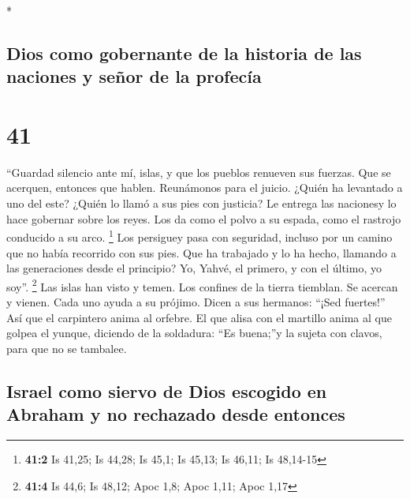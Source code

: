 \begin{paracol}{2}
\begin{otherlanguage}{english}
\end{otherlanguage}

\switchcolumn[0]*

\hypertarget{dios-como-gobernante-de-la-historia-de-las-naciones-y-seuxf1or-de-la-profecuxeda}{%
\subsection{Dios como gobernante de la historia de las naciones y señor
de la
profecía}\label{dios-como-gobernante-de-la-historia-de-las-naciones-y-seuxf1or-de-la-profecuxeda}}

\hypertarget{section-80}{%
\section{41}\label{section-80}}

 ``Guardad silencio ante mí, islas, y que los pueblos
renueven sus fuerzas. Que se acerquen, entonces que hablen. Reunámonos
para el juicio.  ¿Quién ha levantado a uno del este?
¿Quién lo llamó a sus pies con justicia? Le entrega las nacionesy lo
hace gobernar sobre los reyes. Los da como el polvo a su espada, como el
rastrojo conducido a su arco. \footnote{\textbf{41:2} Is 41,25; Is
  44,28; Is 45,1; Is 45,13; Is 46,11; Is 48,14-15}  Los
persiguey pasa con seguridad, incluso por un camino que no había
recorrido con sus pies.  Que ha trabajado y lo ha hecho,
llamando a las generaciones desde el principio? Yo, Yahvé, el primero, y
con el último, yo soy''. \footnote{\textbf{41:4} Is 44,6; Is 48,12; Apoc
  1,8; Apoc 1,11; Apoc 1,17}  Las islas han visto y temen.
Los confines de la tierra tiemblan. Se acercan y vienen. 
Cada uno ayuda a su prójimo. Dicen a sus hermanos: ``¡Sed fuertes!''
 Así que el carpintero anima al orfebre. El que alisa con
el martillo anima al que golpea el yunque, diciendo de la soldadura:
``Es buena;''y la sujeta con clavos, para que no se tambalee.

\hypertarget{israel-como-siervo-de-dios-escogido-en-abraham-y-no-rechazado-desde-entonces}{%
\subsection{Israel como siervo de Dios escogido en Abraham y no
rechazado desde
entonces}\label{israel-como-siervo-de-dios-escogido-en-abraham-y-no-rechazado-desde-entonces}}


\end{paracol}
